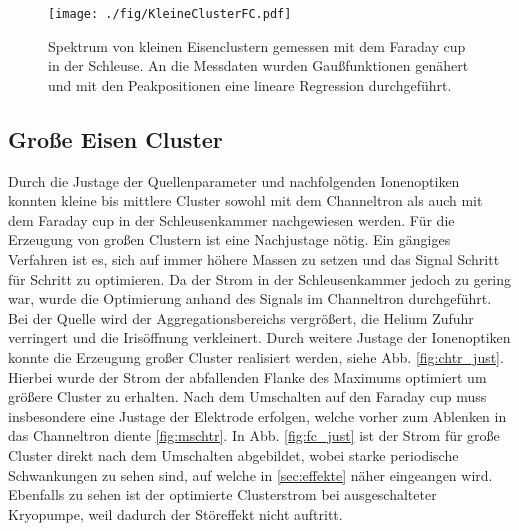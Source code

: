 \begin{figure}
  \centering
  \texttt{[image: ./fig/KleineClusterFC.pdf]}
  \caption{Spektrum von kleinen Eisenclustern gemessen mit dem Faraday cup in der Schleuse. An die Messdaten wurden Gaußfunktionen genähert und mit den Peakpositionen eine lineare Regression durchgeführt.}
  \label{fig:cluster_fc}
\end{figure}


\subsection{Große Eisen Cluster}
Durch die Justage der Quellenparameter und nachfolgenden Ionenoptiken konnten kleine bis mittlere Cluster sowohl mit dem Channeltron als auch mit dem Faraday cup in der Schleusenkammer nachgewiesen werden.
Für die Erzeugung von großen Clustern ist eine Nachjustage nötig.
Ein gängiges Verfahren ist es, sich auf immer höhere Massen zu setzen und das Signal Schritt für Schritt zu optimieren.
Da der Strom in der Schleusenkammer jedoch zu gering war, wurde die Optimierung anhand des Signals im Channeltron durchgeführt.
Bei der Quelle wird der Aggregationsbereichs vergrößert, die Helium Zufuhr verringert und
die Irisöffnung verkleinert.
Durch weitere Justage der Ionenoptiken konnte die Erzeugung großer Cluster realisiert werden, siehe Abb. \ref{fig:chtr_just}.
Hierbei wurde der Strom der abfallenden Flanke des Maximums optimiert um größere Cluster zu erhalten.
Nach dem Umschalten auf den Faraday cup muss insbesondere eine Justage der Elektrode erfolgen, welche vorher zum Ablenken in das Channeltron diente \ref{fig:mschtr}.
In Abb. \ref{fig:fc_just} ist der Strom für große Cluster direkt nach dem Umschalten abgebildet, wobei starke periodische Schwankungen zu sehen sind, auf welche in \ref{sec:effekte} näher eingeangen wird.
Ebenfalls zu sehen ist der optimierte Clusterstrom bei ausgeschalteter Kryopumpe, weil dadurch der Störeffekt nicht auftritt.

